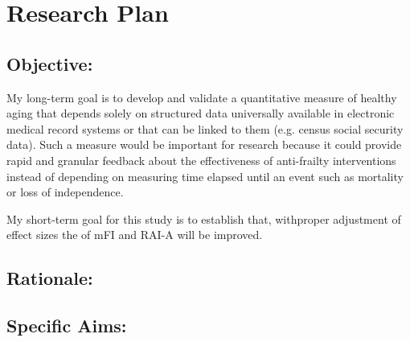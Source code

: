 \section{Research Plan }\label{research-plan}


\subsection{Objective:}\label{objective}
  
My long-term goal is to develop and validate a quantitative measure of healthy aging that depends solely on structured data universally available in electronic medical record systems or that can be linked to them (e.g. census social security data). Such a measure would be important for research because it could provide rapid and granular feedback about the effectiveness of anti-frailty interventions instead of depending on measuring time elapsed until an event such as mortality or loss of independence.

My short-term goal for this study is to establish that, withproper adjustment of effect sizes the  of mFI and RAI-A will be improved. 

\subsection{Rationale:}\label{rationale}

\subsection{Specific Aims:}\label{specific-aims}
